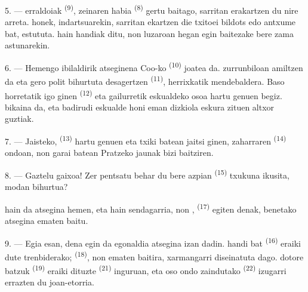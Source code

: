5. ---  erraldoiak \textsuperscript{(9)}, zeinaren habia
 \textsuperscript{(8)} gertu baitago, sarritan erakartzen du
nire arreta.  honek,  indartsuarekin,
sarritan ekartzen die txitoei bildots edo antxume bat, 
estututa.  hain handiak ditu, non luzaroan hegan egin baitezake
bere zama astunarekin.

\VUsaut{3.0mm}
\VUsaut{3.0mm}

6. --- Hemengo ibilaldirik atseginena Coo-ko 
\textsuperscript{(10)} joatea da.  zurrunbiloan amiltzen da
eta gero  polit bihurtuta desagertzen 
\textsuperscript{(11)}, herrixkatik mendebaldera. Baso horretatik igo ginen
 \textsuperscript{(12)} eta 
gailurretik eskualdeko  osoa hartu genuen begiz.
 bikaina da, eta badirudi  eskualde honi eman
dizkiola eskura zituen altxor guztiak.

7. --- Jaisteko,  \textsuperscript{(13)} hartu genuen eta
 txiki batean jaitsi ginen,  zaharraren
 \textsuperscript{(14)} ondoan, non garai batean Pratzeko
jaunak bizi baitziren.

8. --- Gaztelu gaixoa! Zer pentsatu behar du bere azpian  \textsuperscript{(15)} txukuna ikusita,  modan
bihurtua?

 hain da atsegina hemen, eta  hain
sendagarria, non , 
\textsuperscript{(17)} egiten denak, benetako atsegina ematen baitu.

\VUsaut{3.0mm}
\VUsaut{3.0mm}

9. --- Egia esan, dena egin da egonaldia atsegina izan dadin. 
handi bat \textsuperscript{(16)} eraiki dute trenbiderako; 
 \textsuperscript{(18)}, non  ematen
baitira, xarmangarri diseinatuta dago.  dotore batzuk
\textsuperscript{(19)} eraiki dituzte  \textsuperscript{(21)}
inguruan, eta oso ondo zaindutako 
\textsuperscript{(22)} izugarri errazten du joan-etorria.


